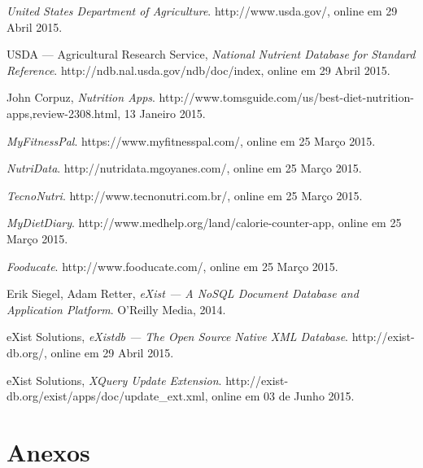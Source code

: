 \documentclass[twocolumn,twoside,11pt,a4paper]{article}
\begin{document}

\renewcommand{\bibname}{Referências}
\begin{thebibliography}{9}


  \emph{United States Department of Agriculture}.
  http://www.usda.gov/,
  online em 29 Abril 2015.

  USDA — Agricultural Research Service,
  \emph{National Nutrient Database for Standard Reference}.
  http://ndb.nal.usda.gov/ndb/doc/index,
  online em 29 Abril 2015.
  
  John Corpuz,
  \emph{Nutrition Apps}.
  http://www.tomsguide.com/us/best-diet-nutrition-apps,review-2308.html,
  13 Janeiro 2015.
  
  \emph{MyFitnessPal}.
  https://www.myfitnesspal.com/,
  online em 25 Março 2015.
  
  \emph{NutriData}.
  http://nutridata.mgoyanes.com/,
  online em 25 Março 2015.
  
  \emph{TecnoNutri}.
  http://www.tecnonutri.com.br/,
  online em 25 Março 2015.
  
  \emph{MyDietDiary}.
  http://www.medhelp.org/land/calorie-counter-app,
  online em 25 Março 2015.
  
  \emph{Fooducate}.
  http://www.fooducate.com/,
  online em 25 Março 2015.
  
  Erik Siegel, Adam Retter,
  \emph{eXist — A NoSQL Document Database and Application Platform}.
  O'Reilly Media,
  2014.
  
     eXist Solutions,
  \emph{eXistdb — The Open Source Native XML Database}.
  http://exist-db.org/,
  online em 29 Abril 2015.


     eXist Solutions,
  \emph{XQuery Update Extension}.
  http://exist-db.org/exist/apps/doc/update\_ext.xml,
  online em 03 de Junho 2015.
  
 
  
  
\end{thebibliography}

\newpage
\clearpage
\appendix
\chapter{\huge{Anexos}}
\end{document}

